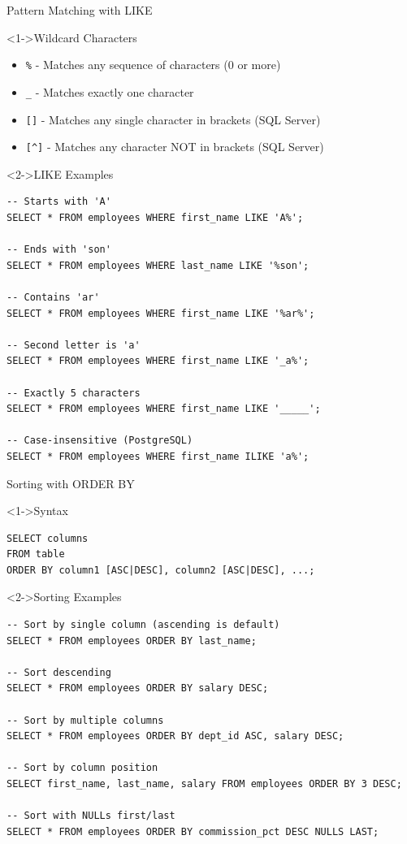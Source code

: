 \documentclass[aspectratio=169,11pt]{beamer}
\begin{document}
\begin{frame}[fragile]{Pattern Matching with LIKE}
\begin{block}<1->{Wildcard Characters}
\begin{itemize}
    \item \texttt{\%} - Matches any sequence of characters (0 or more)
    \item \texttt{\_} - Matches exactly one character
    \item \texttt{[]} - Matches any single character in brackets (SQL Server)
    \item \texttt{[\^{}]} - Matches any character NOT in brackets (SQL Server)
\end{itemize}
\end{block}

\pause
\begin{exampleblock}<2->{LIKE Examples}
\begin{lstlisting}
-- Starts with 'A'
SELECT * FROM employees WHERE first_name LIKE 'A%';

-- Ends with 'son'
SELECT * FROM employees WHERE last_name LIKE '%son';

-- Contains 'ar'
SELECT * FROM employees WHERE first_name LIKE '%ar%';

-- Second letter is 'a'
SELECT * FROM employees WHERE first_name LIKE '_a%';

-- Exactly 5 characters
SELECT * FROM employees WHERE first_name LIKE '_____';

-- Case-insensitive (PostgreSQL)
SELECT * FROM employees WHERE first_name ILIKE 'a%';
\end{lstlisting}
\end{exampleblock}
\end{frame}

\begin{frame}[fragile]{Sorting with ORDER BY}
\begin{block}<1->{Syntax}
\begin{lstlisting}
SELECT columns
FROM table
ORDER BY column1 [ASC|DESC], column2 [ASC|DESC], ...;
\end{lstlisting}
\end{block}

\pause
\begin{exampleblock}<2->{Sorting Examples}
\begin{lstlisting}
-- Sort by single column (ascending is default)
SELECT * FROM employees ORDER BY last_name;

-- Sort descending
SELECT * FROM employees ORDER BY salary DESC;

-- Sort by multiple columns
SELECT * FROM employees ORDER BY dept_id ASC, salary DESC;

-- Sort by column position
SELECT first_name, last_name, salary FROM employees ORDER BY 3 DESC;

-- Sort with NULLs first/last
SELECT * FROM employees ORDER BY commission_pct DESC NULLS LAST;
\end{lstlisting}
\end{exampleblock}
\end{frame}
\end{document}
